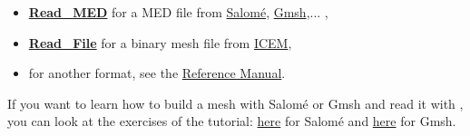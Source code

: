 \begin{itemize}
\item \href{\REFERENCEMANUAL\#readmed}{\textbf{Read\_MED}} for a MED file from \href{http://www.salome-platform.org}{Salom\'e}, \href{http://gmsh.info/}{Gmsh},... ,
\item \href{\REFERENCEMANUAL\#readfile}{\textbf{Read\_File}} for a binary mesh file from \href{http://resource.ansys.com/Products/Other+Products/ANSYS+ICEM+CFD}{ICEM},
\item for another format, see the \href{\REFERENCEMANUAL\#read}{\trustref Reference Manual}.
\end{itemize}

If you want to learn how to build a mesh with Salom\'e or Gmsh and read it with \trust, you can look at the exercises of the \trust tutorial: \href{TRUST_tutorial.pdf\#salome}{here} for Salom\'e and \href{TRUST_tutorial.pdf\#gmsh}{here} for Gmsh.




